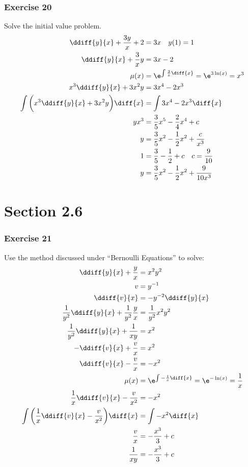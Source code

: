 \documentclass{math}
\begin{document}
\subsubsection*{Exercise 20}
Solve the initial value problem.
\begin{align*}
  \ddiff{y}{x}+\frac{3y}{x}+2 &= 3x \quad y(1) = 1 \\
  \ddiff{y}{x}+\frac{3}{x}y &= 3x-2 \\
  \mu(x) &= \e^{\int\frac{3}{x}\diff{x}} = \e^{3\ln(x)} = x^3 \\
  x^3\ddiff{y}{x}+3x^2y &= 3x^4-2x^3 \\
  \int\bigg(x^3\ddiff{y}{x}+3x^2y\bigg)\diff{x} &= \int3x^4-2x^3\diff{x} \\
  yx^3 &= \frac{3}{5}x^5-\frac{2}{4}x^4+c \\
  y &= \frac{3}{5}x^2-\frac{1}{2}x^2+\frac{c}{x^3} \\
  1 &= \frac{3}{5}-\frac{1}{2}+c \quad c = \frac{9}{10} \\
  y &= \frac{3}{5}x^2-\frac{1}{2}x^2+\frac{9}{10x^3} \\
\end{align*}

\section*{Section 2.6}

\subsubsection*{Exercise 21}
Use the method discussed under ``Bernoulli Equations'' to solve:
\begin{align*}
  \ddiff{y}{x}+\frac{y}{x} &= x^2y^2 \\
  v &= y^{-1} \\
  \ddiff{v}{x} &= -y^{-2}\ddiff{y}{x} \\
  \frac{1}{y^2}\ddiff{y}{x}+\frac{1}{y^2}\frac{y}{x} &= \frac{1}{y^2}x^2y^2 \\
  \frac{1}{y^2}\ddiff{y}{x}+\frac{1}{xy} &= x^2 \\
  -\ddiff{v}{x}+\frac{v}{x} &= x^2 \\
  \ddiff{v}{x}-\frac{v}{x} &= -x^2 \\
  \mu(x) &= \e^{\int-\frac{1}{x}\diff{x}} = \e^{-\ln(x)} = \frac{1}{x} \\
  \frac{1}{x}\ddiff{v}{x}-\frac{v}{x^2} &= -x^2 \\
  \int\bigg(\frac{1}{x}\ddiff{v}{x}-\frac{v}{x^2}\bigg)\diff{x} &= \int-x^2\diff{x} \\
  \frac{v}{x} &= -\frac{x^3}{3}+c \\
  \frac{1}{xy} &= -\frac{x^3}{3}+c
\end{align*}
\end{document}
